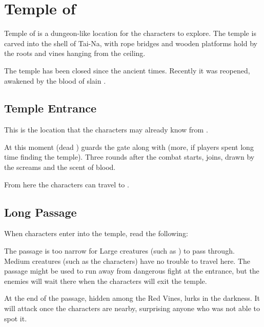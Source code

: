 \section{Temple of \npcSprenVines{}}
\label{sec:templeDungeon}

Temple of \npcSprenVines{} is a dungeon-like location for the characters to explore. The temple is carved into the shell of Tai-Na, with rope bridges and wooden platforms hold by the roots and vines hanging from the ceiling.

The temple has been closed since the ancient times. Recently it was reopened, awakened by the blood of slain \npcDeadExplorer{}.


\subsection{Temple Entrance}
\label{ssec:dungeonEntrance}

This is the location that the characters may already know from .

At this moment \enemyReanimatedPerson{} (dead \npcDeadExplorer{}) guards the gate along with \enemyReanimatedRemains{} (more, if players spent long time finding the temple). Three rounds after the combat starts, \enemyReanimatedWhitespine{} joins, drawn by the screams and the scent of blood.

From here the characters can travel to .

\subsection{Long Passage}
\label{ssec:dungeonPassage}

When characters enter into the temple, read the following:


The passage is too narrow for Large creatures (such as \enemyReanimatedWhitespine{}) to pass through. Medium creatures (such as the characters) have no trouble to travel here. The passage might be used to run away from dangerous fight at the entrance, but the enemies will wait there when the characters will exit the temple.

At the end of the passage, hidden among the Red Vines, \enemyVineMonster{} lurks in the darkness. It will attack once the characters are nearby, surprising anyone who was not able to spot it.

